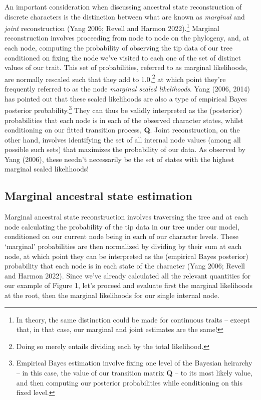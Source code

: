 \documentclass{article}
\begin{document}
An important consideration when discussing ancestral state reconstruction of discrete characters is the distinction between what are known as \emph{marginal} and \emph{joint} reconstruction (Yang 2006; Revell and Harmon 2022).\footnote{In theory, the same distinction could be made for continuous traits -- except that, in that case, our marginal and joint estimates are the same!} Marginal reconstruction involves proceeding from node to node on the phylogeny, and, at each node, computing the probability of observing the tip data of our tree conditioned on fixing the node we've visited to each one of the set of distinct values of our trait. This set of probabilities, referred to as marginal likelihoods, are normally rescaled such that they add to 1.0,\footnote{Doing so merely entails dividing each by the total likelihood.} at which point they're frequently referred to as the node \emph{marginal scaled likelihoods}. Yang (2006, 2014) has pointed out that these scaled likelihoods are also a type of empirical Bayes posterior probability.\footnote{Empirical Bayes estimation involve fixing one level of the Bayesian heirarchy -- in this case, the value of our transition matrix \textbf{Q} -- to its most likely value, and then computing our posterior probabilities while conditioning on this fixed level.} They can thus be validly interpreted as the (posterior) probabilities that each node is in each of the observed character states, whilst conditioning on our fitted transition process, \textbf{Q}. Joint reconstruction, on the other hand, involves identifying the set of all internal node values (among all possible such sets) that maximizes the probability of our data. As observed by Yang (2006), these needn't necessarily be the set of states with the highest marginal scaled likelihoods!

\subsection{Marginal ancestral state estimation}\label{marginal-ancestral-state-estimation}

Marginal ancestral state reconstruction involves traversing the tree and at each node calculating the probability of the tip data in our tree under our model, conditioned on our current node being in each of our character levels. These `marginal' probabilities are then normalized by dividing by their sum at each node, at which point they can be interpreted as the (empirical Bayes posterior) probability that each node is in each state of the character (Yang 2006; Revell and Harmon 2022). Since we've already calculated all the relevant quantities for our example of Figure 1, let's proceed and evaluate first the marginal likelihoods at the root, then the marginal likelihoods for our single internal node.
\end{document}
